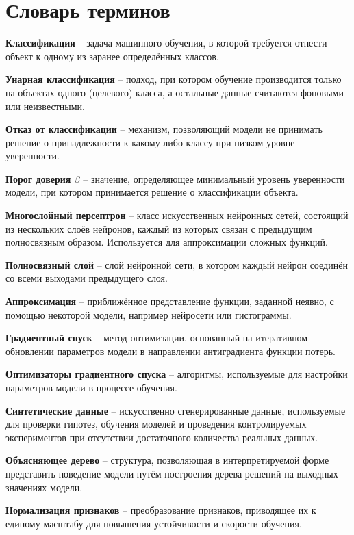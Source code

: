 \chapter*{Словарь терминов}             %

\textbf{Классификация} -- задача машинного обучения, в которой требуется отнести объект к одному из заранее определённых классов.

\textbf{Унарная классификация} -- подход, при котором обучение производится только на объектах одного (целевого) класса, а остальные данные считаются фоновыми или неизвестными.

\textbf{Отказ от классификации} -- механизм, позволяющий модели не принимать решение о принадлежности к какому-либо классу при низком уровне уверенности.

\textbf{Порог доверия \(\beta\)} -- значение, определяющее минимальный уровень уверенности модели, при котором принимается решение о классификации объекта.

\textbf{Многослойный персептрон} -- класс искусственных нейронных сетей, состоящий из нескольких слоёв нейронов, каждый из которых связан с предыдущим полносвязным образом. Используется для аппроксимации сложных функций.

\textbf{Полносвязный слой} -- слой нейронной сети, в котором каждый нейрон соединён со всеми выходами предыдущего слоя.

\textbf{Аппроксимация} -- приближённое представление функции, заданной неявно, с помощью некоторой модели, например нейросети или гистограммы.

\textbf{Градиентный спуск} -- метод оптимизации, основанный на итеративном обновлении параметров модели в направлении антиградиента функции потерь.

\textbf{Оптимизаторы градиентного спуска} -- алгоритмы, используемые для настройки параметров модели в процессе обучения.

\textbf{Синтетические данные} -- искусственно сгенерированные данные, используемые для проверки гипотез, обучения моделей и проведения контролируемых экспериментов при отсутствии достаточного количества реальных данных.

\textbf{Объясняющее дерево} -- структура, позволяющая в интерпретируемой форме представить поведение модели путём построения дерева решений на выходных значениях модели.

\textbf{Нормализация признаков} -- преобразование признаков, приводящее их к единому масштабу для повышения устойчивости и скорости обучения.
